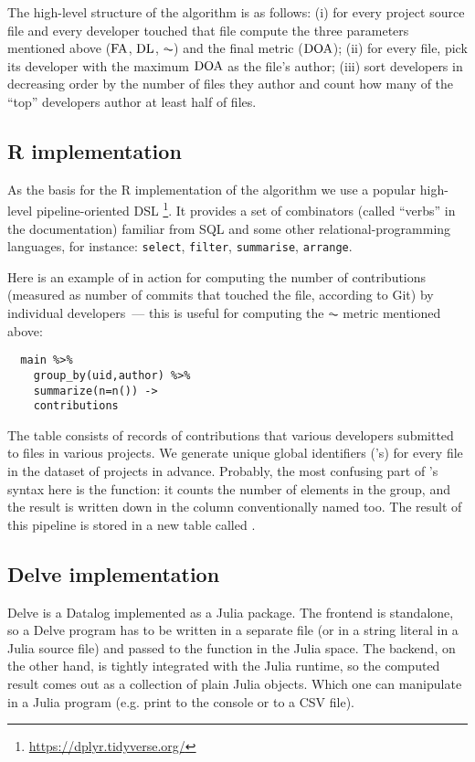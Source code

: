 The high-level structure of the algorithm is as follows: (i) for every project
source file and every developer touched that file compute the three
parameters mentioned above ($\operatorname{FA}$, $\operatorname{DL}$, $\AC$) and the final metric ($\operatorname{DOA}$);
(ii) for every file, pick its developer with the maximum $\operatorname{DOA}$ as the file's
author; (iii) sort developers in decreasing order by the number of files
they author and count how many of the ``top'' developers author at least
half of files.

\subsection{R implementation}

As the basis for the R implementation of the algorithm we use a popular high-level
pipeline-oriented DSL \dplyr\footnote{%
\url{https://dplyr.tidyverse.org/}%
}. It provides a set of combinators (called ``verbs'' in the documentation)
familiar from SQL and some other relational-programming languages, for instance:
\texttt{select},
\texttt{filter},
\texttt{summarise},
\texttt{arrange}.

Here is an example of \dplyr in action for computing the number of contributions
(measured as number of commits that touched the file, according to Git) by individual
developers~--- this is useful for computing the $\AC$ metric mentioned above:
\begin{verbatim}
  main %>%
    group_by(uid,author) %>%
    summarize(n=n()) ->
    contributions
\end{verbatim}
The  table consists of records of contributions that various developers
submitted to files in various projects.
We generate unique global identifiers ('s) for every file in the
dataset of projects in advance. Probably, the most confusing part of \dplyr's
syntax here is the  function: it counts the number of elements in the
group, and the result is written down in the column conventionally named 
too. The result of this pipeline is stored in a new table called .


\subsection{Delve implementation}

Delve is a Datalog implemented as a Julia package. The frontend is standalone,
so a Delve program has to be written in a separate file (or in a string literal in a Julia
source file) and passed to the  function in the Julia space.
The backend, on the other hand, is tightly integrated with the Julia runtime, so
the computed result comes out as a collection of plain Julia objects. Which one can
manipulate in a Julia program (e.g. print to the console or to a CSV file).


